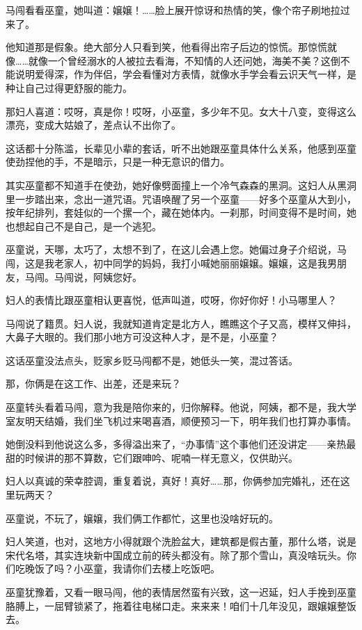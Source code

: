 \documentclass[lang=cn,newtx,12pt,scheme=chinese]{elegantbook}
\begin{document}
马闯看看巫童，她叫道：嬢嬢！……脸上展开惊讶和热情的笑，像个帘子刷地拉过来了。

他知道那是假象。绝大部分人只看到笑，他看得出帘子后边的惊慌。那惊慌就像……就像一个曾经溺水的人被拉去看海，不知情的人还问她，海美不美？这倒不能说明爱得深，作为伴侣，学会看懂对方表情，就像水手学会看云识天气一样，是种让自己过得更舒服的能力。

那妇人喜道：哎呀，真是你！哎呀，小巫童，多少年不见。女大十八变，变得这么漂亮，变成大姑娘了，差点认不出你了。

这话都十分陈滥，长辈见小辈的套话，听不出她跟巫童具体什么关系，他感到巫童使劲捏他的手，不是暗示，只是一种无意识的借力。

其实巫童都不知道手在使劲，她好像劈面撞上一个冷气森森的黑洞。这妇人从黑洞里一步踏出来，念出一道咒语。咒语唤醒了另一个巫童——好多个巫童从大到小，按年纪排列，套娃似的一个摞一个，藏在她体内。一刹那，时间变得不是时间，她也想起自己不是自己，是一个逃犯。

巫童说，天哪，太巧了，太想不到了，在这儿会遇上您。她偏过身子介绍说，马闯，这是我老家人，初中同学的妈妈，我打小喊她丽丽嬢嬢。嬢嬢，这是我男朋友，马闯。马闯说，阿姨您好。

妇人的表情比跟巫童相认更喜悦，低声叫道，哎呀，你好你好！小马哪里人？

马闯说了籍贯。妇人说，我就知道肯定是北方人，瞧瞧这个子又高，模样又伸抖，大鼻子大眼的。我们那小地方可没这种人才，是不是，小巫童？

这话巫童没法点头，贬家乡贬马闯都不是，她低头一笑，混过答话。

那，你俩是在这工作、出差，还是来玩？

巫童转头看着马闯，意为我是陪你来的，归你解释。他说，阿姨，都不是，我大学室友明天结婚，我们坐飞机过来喝喜酒，顺便预习一下，明年我们也打算办事情。

她倒没料到他说这么多，多得溢出来了，“办事情”这个事他们还没讲定——亲热最甜的时候讲的那不算数，它们跟呻吟、呢喃一样无意义，仅供助兴。

妇人以真诚的荣幸腔调，重复着说，真好！真好……那，你俩参加完婚礼，还在这里玩两天？

巫童说，不玩了，嬢嬢，我们俩工作都忙，这里也没啥好玩的。

妇人笑道，也对，这地方小得就跟个洗脸盆大，建筑都是假古董，那什么塔，说是宋代名塔，其实连块新中国成立前的砖头都没有。除了那个雪山，真没啥玩头。你们吃晚饭了吗？小巫童，我请你们去楼上吃饭吧。

巫童犹豫着，又看一眼马闯，他的表情居然蛮有兴致，这一迟延，妇人手挽到巫童胳膊上，一屈臂锁紧了，拖着往电梯口走。来来来！咱们十几年没见，跟嬢嬢整饭去。
\end{document}
